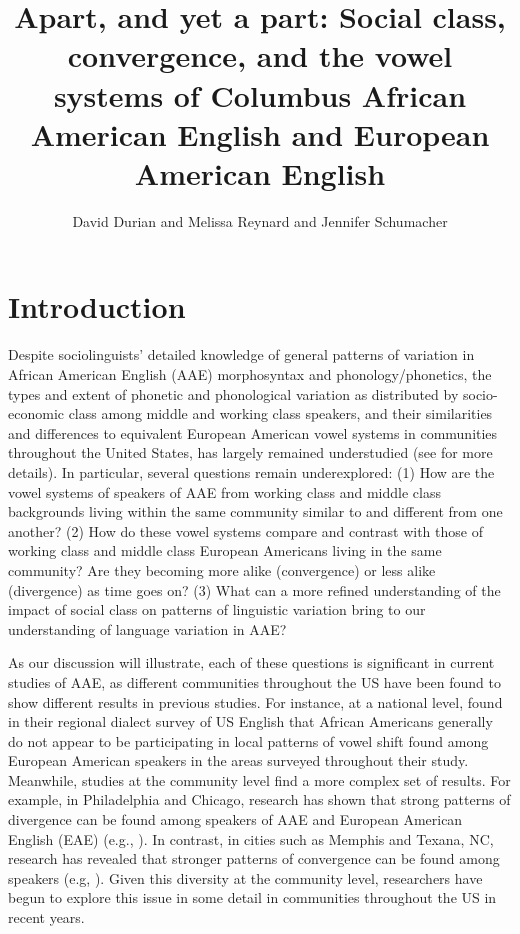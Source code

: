 \documentclass[output=paper,colorlinks,citecolor=brown]{langscibook}
\author{David Durian\affiliation{Pennsylvania State University} and
Melissa Reynard\affiliation{North Carolina State University} and
Jennifer Schumacher}
\title[Apart, and yet a part]{Apart, and yet a part: Social class, convergence, and the vowel systems of Columbus African American English and European American English}
\begin{document}
\AffiliationsWithIndexing{}
\maketitle



\section{Introduction}
Despite sociolinguists’ detailed knowledge of general patterns of variation in African American English (AAE) morphosyntax and phonology/phonetics, the types and extent of phonetic and phonological variation as distributed by socio-economic class among middle and working class speakers, and their similarities and differences to equivalent European American vowel systems in communities throughout the United States, has largely remained understudied (see \citet{britt2015african} for more details).  In particular, several questions remain underexplored: (1) How are the vowel systems of speakers of AAE from working class and middle class backgrounds living within the same community similar to and different from one another? (2) How do these vowel systems compare and contrast with those of working class and middle class European Americans living in the same community? Are they becoming more alike (convergence) or less alike (divergence) as time goes on? (3) What can a more refined understanding of the impact of social class on patterns of linguistic variation bring to our understanding of language variation in AAE?

 As our discussion will illustrate, each of these questions is significant in current studies of AAE, as different communities throughout the US have been found to show different results in previous studies. For instance, at a national level, \citet{labov2006atlas} found in their regional dialect survey of US English that African Americans generally do not appear to be participating in local patterns of vowel shift found among European American speakers in the areas surveyed throughout their study. Meanwhile, studies at the community level find a more complex set of results. For example, in Philadelphia and Chicago, research has shown that strong patterns of divergence can be found among speakers of AAE and European American English (EAE) (e.g., \citealt{LabovHarris1986,Gordon2000}). In contrast, in cities such as Memphis and Texana, NC, research has revealed that stronger patterns of convergence can be found among speakers (e.g, \citealt{fridland2003network,FridlandBartlett2006,childscarpenter2010}). Given this diversity at the community level, researchers have begun to explore this issue in some detail in communities throughout the US in recent years.
\end{document}

